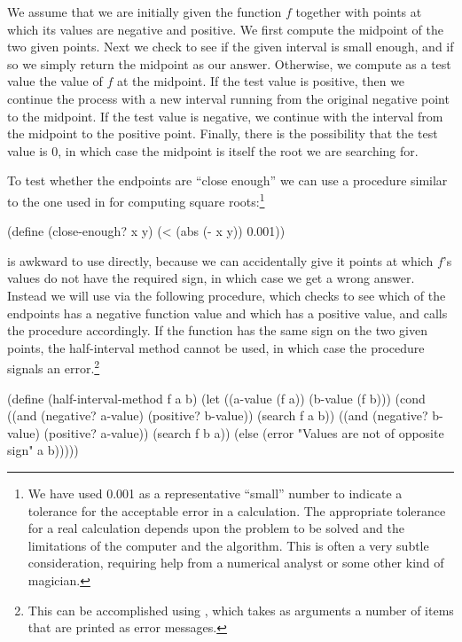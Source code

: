 \noindent
We assume that we are initially given the function \( f \) together with points
at which its values are negative and positive.  We first compute the midpoint
of the two given points.  Next we check to see if the given interval is small
enough, and if so we simply return the midpoint as our answer.  Otherwise, we
compute as a test value the value of \( f \) at the midpoint.  If the test value
is positive, then we continue the process with a new interval running from the
original negative point to the midpoint.  If the test value is negative, we
continue with the interval from the midpoint to the positive point.  Finally,
there is the possibility that the test value is 0, in which case the midpoint
is itself the root we are searching for.

To test whether the endpoints are ``close enough'' we can use a procedure
similar to the one used in  for computing square
roots:\footnote{We have used 0.001 as a representative ``small'' number to
indicate a tolerance for the acceptable error in a calculation.  The
appropriate tolerance for a real calculation depends upon the problem to be
solved and the limitations of the computer and the algorithm.  This is often a
very subtle consideration, requiring help from a numerical analyst or some
other kind of magician.}

\begin{codeBlock}
(define (close-enough? x y) (< (abs (- x y)) 0.001))
\end{codeBlock}

\noindent
{} is awkward to use directly, because we can accidentally give it
points at which \( f \)'s values do not have the required sign, in which case we
get a wrong answer.  Instead we will use  via the following
procedure, which checks to see which of the endpoints has a negative function
value and which has a positive value, and calls the  procedure
accordingly.  If the function has the same sign on the two given points, the
half-interval method cannot be used, in which case the procedure signals an
error.\footnote{This can be accomplished using , which takes as
arguments a number of items that are printed as error messages.}

\begin{codeBlock}
(define (half-interval-method f a b)
  (let ((a-value (f a))
        (b-value (f b)))
    (cond ((and (negative? a-value) (positive? b-value))
           (search f a b))
          ((and (negative? b-value) (positive? a-value))
           (search f b a))
          (else
           (error "Values are not of opposite sign" a b)))))
\end{codeBlock}

